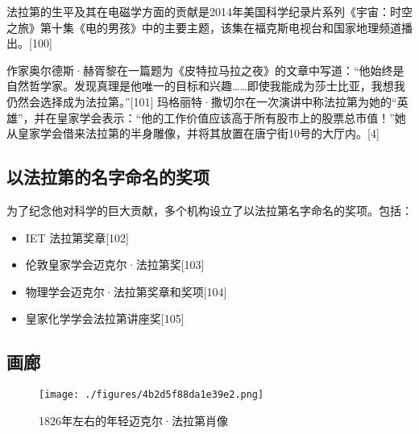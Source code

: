 法拉第的生平及其在电磁学方面的贡献是2014年美国科学纪录片系列《宇宙：时空之旅》第十集《电的男孩》中的主要主题，该集在福克斯电视台和国家地理频道播出。[100]

作家奥尔德斯·赫胥黎在一篇题为《皮特拉马拉之夜》的文章中写道：“他始终是自然哲学家。发现真理是他唯一的目标和兴趣……即使我能成为莎士比亚，我想我仍然会选择成为法拉第。”[101] 玛格丽特·撒切尔在一次演讲中称法拉第为她的“英雄”，并在皇家学会表示：“他的工作价值应该高于所有股市上的股票总市值！”她从皇家学会借来法拉第的半身雕像，并将其放置在唐宁街10号的大厅内。[4]
\subsection{以法拉第的名字命名的奖项 } 
为了纪念他对科学的巨大贡献，多个机构设立了以法拉第名字命名的奖项。包括：
\begin{itemize}
\item IET 法拉第奖章[102]  
\item 伦敦皇家学会迈克尔·法拉第奖[103]  
\item 物理学会迈克尔·法拉第奖章和奖项[104]  
\item 皇家化学学会法拉第讲座奖[105]
\end{itemize}
\subsection{画廊}
\begin{figure}[ht]
\centering
\texttt{[image: ./figures/4b2d5f88da1e39e2.png]}
\caption{1826年左右的年轻迈克尔·法拉第肖像} \label{fig_FLD_2}
\end{figure}
